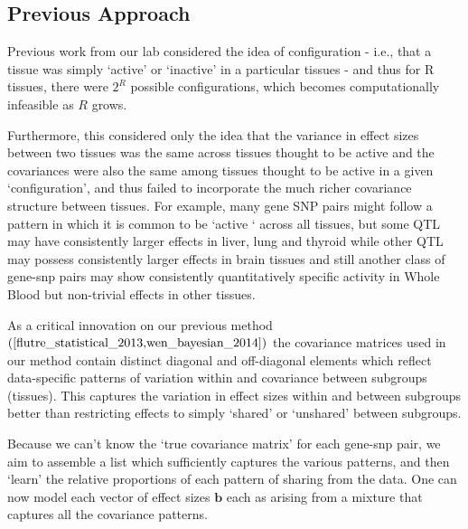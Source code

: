 \subsection{Previous Approach}
 
Previous work from our lab considered the idea of configuration - i.e., that a tissue was simply `active' or `inactive' in a particular tissues - and thus for R tissues, there were $2^{R}$ possible configurations, which becomes computationally infeasible as $R$ grows.

Furthermore, this considered only the idea that the variance in effect sizes between two tissues was the same across tissues thought to be active and the covariances were also the same among tissues thought to be active in a given `configuration',  and thus failed to incorporate the much richer covariance structure between tissues. For example, many gene SNP pairs might follow a pattern in which it is common to be `active ` across all tissues, but some QTL may have consistently larger effects in liver, lung and thyroid while other QTL may possess consistently larger effects in brain tissues and still another class of gene-snp pairs may show consistently quantitatively specific activity in Whole Blood but non-trivial effects in other tissues. 

As a critical innovation on our previous method $(\cite{flutre_statistical_2013,wen_bayesian_2014})$ the covariance matrices used in our method contain distinct diagonal and off-diagonal elements which reflect data-specific patterns of variation within and covariance between subgroups (tissues). This captures the variation in effect sizes within and between subgroups better than restricting effects to simply `shared' or `unshared' between subgroups. 
 
Because we can't know the `true covariance matrix' for each gene-snp pair, we aim to assemble a list which sufficiently captures the various patterns, and then `learn' the relative proportions of each pattern of sharing from the data. One can now model each vector of effect sizes $\bm{b}$ each as arising from a mixture that captures all the covariance patterns.

